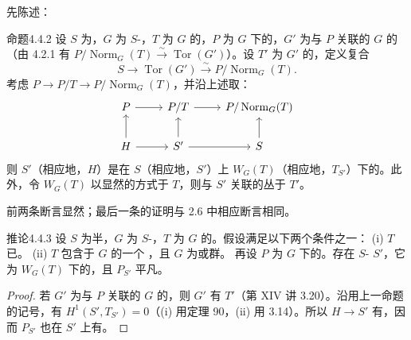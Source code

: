 先陈述：
\begin{SGAresult}{命题}{4.4.2}
设 $S$ 为，$G$ 为 $S$-，$T$ 为 $G$ 的，$P$ 为 $G$ 下的，$G'$ 为与 $P$ 关联的 $G$ 的（由 4.2.1 有 $P/\operatorname{Norm}_G(T)\xrightarrow\sim\operatorname{Tor}(G')$）。设 $T'$ 为 $G'$ 的，定义复合
\[S\longrightarrow\operatorname{Tor}(G')\xrightarrow\sim P/\operatorname{Norm}_G(T).\]
考虑 $P\to P/T\to P/\operatorname{Norm}_G(T)$，并沿上述取：
\[\begin{tikzcd}
P\arrow[r]&P/T\arrow[r]&P/\operatorname{Norm}_G(T)\\
H\arrow[u]\arrow[r]&S'\arrow[u]\arrow[r]&S\arrow[u]
\end{tikzcd}\]
则 $S'$（相应地，$H$）是在 $S$（相应地，$S'$）上 $W_G(T)$（相应地，$T_{S'}$）下的。此外，令 $W_G(T)$ 以显然的方式于 $T$，则与 $S'$ 关联的丛于 $T'$。
\end{SGAresult}
前两条断言显然；最后一条的证明与 2.6 中相应断言相同。
\begin{SGAresult}{推论}{4.4.3}
设 $S$ 为半，$G$ 为 $S$-，$T$ 为 $G$ 的。假设满足以下两个条件之一：
(i) $T$ 已。
(ii) $T$ 包含于 $G$ 的一个 ，且 $G$ 为或群。
再设 $P$ 为 $G$ 下的。存在 $S$- $S'$，它为 $W_G(T)$ 下的，且 $P_{S'}$ 平凡。
\end{SGAresult}
\begin{proof}
若 $G'$ 为与 $P$ 关联的 $G$ 的，则 $G'$ 有 $T'$（第 XIV 讲 3.20）。沿用上一命题的记号，有 $H^1(S',T_{S'})=0$（(i) 用定理 90，(ii) 用 3.14）。所以 $H\to S'$ 有，因而 $P_{S'}$ 也在 $S'$ 上有。
\end{proof}
